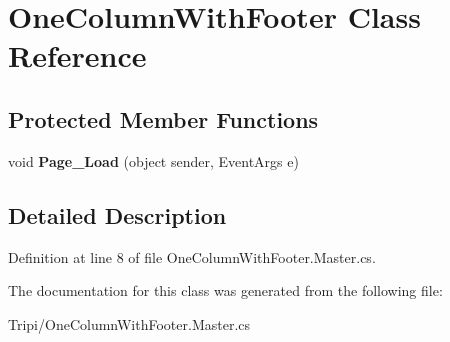 \hypertarget{class_one_column_with_footer}{
\section{OneColumnWithFooter Class Reference}
\label{class_one_column_with_footer}
}
\subsection*{Protected Member Functions}
\begin{DoxyCompactItemize}
\item 
\hypertarget{class_one_column_with_footer_abd3528cf77c7dc0c0e1d3282adbed0d5}{
void {\bfseries Page\_\-Load} (object sender, EventArgs e)}
\label{class_one_column_with_footer_abd3528cf77c7dc0c0e1d3282adbed0d5}

\end{DoxyCompactItemize}


\subsection{Detailed Description}


Definition at line 8 of file OneColumnWithFooter.Master.cs.

The documentation for this class was generated from the following file:\begin{DoxyCompactItemize}
\item 
Tripi/OneColumnWithFooter.Master.cs\end{DoxyCompactItemize}
